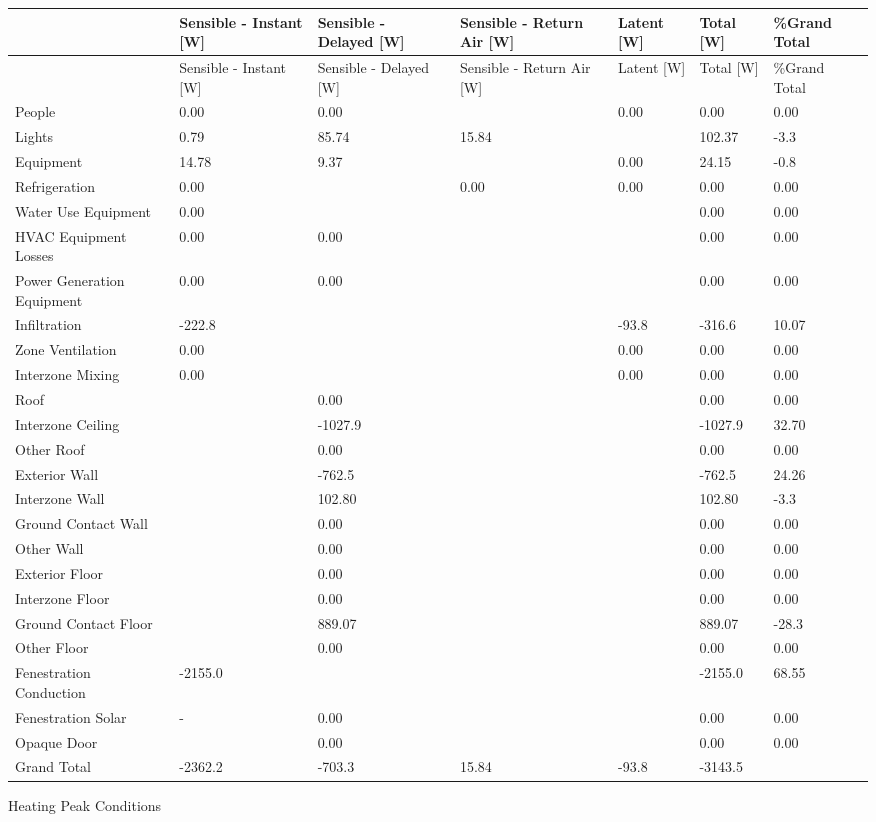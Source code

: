 \begin{longtable}[c]{>{\raggedright}p{0.85in}>{\raggedright}p{0.85in}>{\raggedright}p{0.85in}>{\raggedright}p{0.85in}>{\raggedright}p{0.85in}>{\raggedright}p{0.85in}>{\raggedright}p{0.85in}}
\toprule 
 & Sensible - Instant [W] & Sensible - Delayed [W] & Sensible - Return Air [W] & Latent [W] & Total [W] & \%Grand Total \tabularnewline
\midrule
\endfirsthead

\toprule 
 & Sensible - Instant [W] & Sensible - Delayed [W] & Sensible - Return Air [W] & Latent [W] & Total [W] & \%Grand Total \tabularnewline
\midrule
\endhead

People & 0.00 & 0.00 & ~ & 0.00 & 0.00 & 0.00 \tabularnewline
Lights & 0.79 & 85.74 & 15.84 & ~ & 102.37 & -3.3 \tabularnewline
Equipment & 14.78 & 9.37 & ~ & 0.00 & 24.15 & -0.8 \tabularnewline
Refrigeration & 0.00 & ~ & 0.00 & 0.00 & 0.00 & 0.00 \tabularnewline
Water Use Equipment & 0.00 & ~ & ~ & ~ & 0.00 & 0.00 \tabularnewline
HVAC Equipment Losses & 0.00 & 0.00 & ~ & ~ & 0.00 & 0.00 \tabularnewline
Power Generation Equipment & 0.00 & 0.00 & ~ & ~ & 0.00 & 0.00 \tabularnewline
Infiltration & -222.8 & ~ & ~ & -93.8 & -316.6 & 10.07 \tabularnewline
Zone Ventilation & 0.00 & ~ & ~ & 0.00 & 0.00 & 0.00 \tabularnewline
Interzone Mixing & 0.00 & ~ & ~ & 0.00 & 0.00 & 0.00 \tabularnewline
Roof & ~ & 0.00 & ~ & ~ & 0.00 & 0.00 \tabularnewline
Interzone Ceiling & ~ & -1027.9 & ~ & ~ & -1027.9 & 32.70 \tabularnewline
Other Roof & ~ & 0.00 & ~ & ~ & 0.00 & 0.00 \tabularnewline
Exterior Wall & ~ & -762.5 & ~ & ~ & -762.5 & 24.26 \tabularnewline
Interzone Wall & ~ & 102.80 & ~ & ~ & 102.80 & -3.3 \tabularnewline
Ground Contact Wall & ~ & 0.00 & ~ & ~ & 0.00 & 0.00 \tabularnewline
Other Wall & ~ & 0.00 & ~ & ~ & 0.00 & 0.00 \tabularnewline
Exterior Floor & ~ & 0.00 & ~ & ~ & 0.00 & 0.00 \tabularnewline
Interzone Floor & ~ & 0.00 & ~ & ~ & 0.00 & 0.00 \tabularnewline
Ground Contact Floor & ~ & 889.07 & ~ & ~ & 889.07 & -28.3 \tabularnewline
Other Floor & ~ & 0.00 & ~ & ~ & 0.00 & 0.00 \tabularnewline
Fenestration Conduction & -2155.0 & ~ & ~ & ~ & -2155.0 & 68.55 \tabularnewline
Fenestration Solar & - & 0.00 & ~ & ~ & 0.00 & 0.00 \tabularnewline
Opaque Door & ~ & 0.00 & ~ & ~ & 0.00 & 0.00 \tabularnewline
Grand Total & -2362.2 & -703.3 & 15.84 & -93.8 & -3143.5 & ~ \tabularnewline
\bottomrule
\end{longtable}

Heating Peak Conditions

